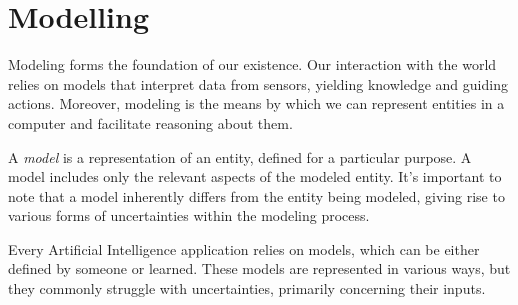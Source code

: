 \section{Modelling}

Modeling forms the foundation of our existence. Our interaction with the world relies on models that interpret data from sensors, yielding knowledge and guiding actions. 
Moreover, modeling is the means by which we can represent entities in a computer and facilitate reasoning about them.
\begin{definition}
    A \emph{model} is a representation of an entity, defined for a particular purpose. A model includes only the relevant aspects of the modeled entity. 
    It's important to note that a model inherently differs from the entity being modeled, giving rise to various forms of uncertainties within the modeling process.
\end{definition}
Every Artificial Intelligence application relies on models, which can be either defined by someone or learned. These models are represented in various ways, but they commonly struggle with uncertainties, primarily concerning their inputs.